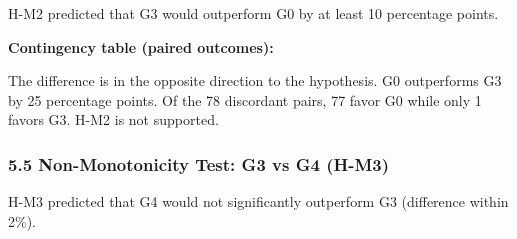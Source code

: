 H-M2 predicted that G3 would outperform G0 by at least 10 percentage points.

\begin{table}[htbp]
\centering
{}
\end{table}

\textbf{Contingency table (paired outcomes):}

\begin{table}[htbp]
\centering
{}
\end{table}

The difference is in the opposite direction to the hypothesis. G0 outperforms G3 by 25 percentage points. Of the 78 discordant pairs, 77 favor G0 while only 1 favors G3. H-M2 is not supported.

\subsubsection{5.5 Non-Monotonicity Test: G3 vs G4 (H-M3)}

H-M3 predicted that G4 would not significantly outperform G3 (difference within 2\%).

\begin{table}[htbp]
\centering
{}
\end{table}

